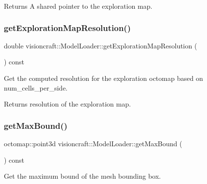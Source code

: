 \begin{DoxyReturn}{Returns}
A shared pointer to the exploration map. 
\end{DoxyReturn}
\mbox{\label{classvisioncraft_1_1ModelLoader_a124c5b8cb8ef25534fce513fc225c9ec}} 
\subsubsection{\texorpdfstring{get\+Exploration\+Map\+Resolution()}{getExplorationMapResolution()}}
{\footnotesize\ttfamily double visioncraft\+::\+Model\+Loader\+::get\+Exploration\+Map\+Resolution (\begin{DoxyParamCaption}{ }\end{DoxyParamCaption}) const\hspace{0.3cm}{\ttfamily [inline]}}



Get the computed resolution for the exploration octomap based on num\+\_\+cells\+\_\+per\+\_\+side. 

\begin{DoxyReturn}{Returns}
resolution of the exploration map. 
\end{DoxyReturn}
\mbox{\label{classvisioncraft_1_1ModelLoader_a9b0654b6b9064477d4b8536368faddbd}} 
\subsubsection{\texorpdfstring{get\+Max\+Bound()}{getMaxBound()}}
{\footnotesize\ttfamily octomap\+::point3d visioncraft\+::\+Model\+Loader\+::get\+Max\+Bound (\begin{DoxyParamCaption}{ }\end{DoxyParamCaption}) const\hspace{0.3cm}{\ttfamily [inline]}}



Get the maximum bound of the mesh bounding box. 

